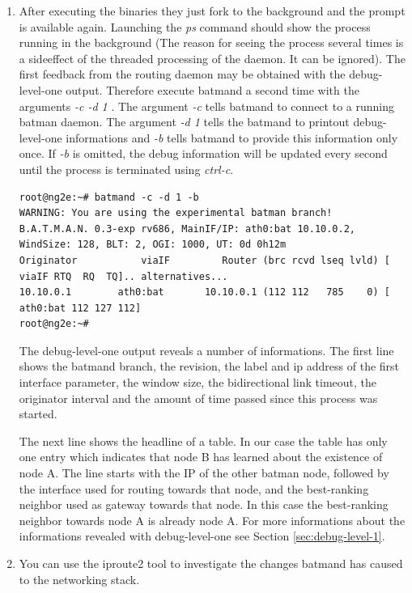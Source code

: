 \documentclass[11pt]{article}
\begin{document}
\begin{enumerate}
\item After executing the binaries they just fork to the background and the prompt is available again. 
Launching the \emph{ps} command should show the process running in the background (The reason for seeing the process several times is a sideeffect of the threaded processing of the daemon. It can be ignored). 
The first feedback from the routing daemon may be obtained with the debug-level-one output. 
Therefore execute batmand a second time with the arguments \emph{ -c -d 1 }. 
The argument \emph{-c} tells batmand to connect to a running batman daemon. 
The argument \emph{-d 1} tells the batmand to printout debug-level-one informations and 
\emph{-b} tells batmand to provide this information only once. 
If \emph{-b} is omitted, the debug information will be updated every second until the process is terminated using \emph{ctrl-c}.

\begin{small} \begin{verbatim}
root@ng2e:~# batmand -c -d 1 -b
WARNING: You are using the experimental batman branch!
B.A.T.M.A.N. 0.3-exp rv686, MainIF/IP: ath0:bat 10.10.0.2, WindSize: 128, BLT: 2, OGI: 1000, UT: 0d 0h12m
Originator           viaIF         Router (brc rcvd lseq lvld) [    viaIF RTQ  RQ  TQ].. alternatives...
10.10.0.1        ath0:bat       10.10.0.1 (112 112   785    0) [ ath0:bat 112 127 112]
root@ng2e:~#
\end{verbatim} \end{small}

The debug-level-one output reveals a number of informations. The first line shows the batmand branch, the revision, the label and ip address of the first interface parameter, the window size, the bidirectional link timeout, the originator interval and the amount of time passed since this process was started. 

The next line shows the headline of a table. 
In our case the table has only one entry which indicates that node B has learned about the existence of node A.
The line starts with the IP of the other batman node, followed by the interface used for routing towards that node, and the best-ranking neighbor used as gateway towards that node. In this case the best-ranking neighbor towards node A is already node A.
For more informations about the informations revealed with debug-level-one see Section \ref{sec:debug-level-1}.

\item You can use the iproute2 tool to investigate the changes batmand has caused to the networking stack.


\end{enumerate}
\end{document}
